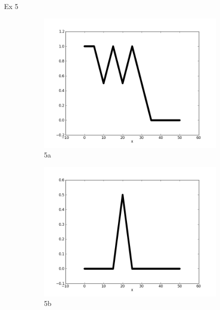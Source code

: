 \documentclass{report}
\begin{document}
\newpage
Ex 5
\begin{figure}[ht]
        \begin{subfigure}[b]{0.5\textwidth}
                \centering
                \includegraphics[width=\textwidth]{ex5a.png}
                \caption{5a}
        \end{subfigure}
	\begin{subfigure}[b]{0.5\textwidth}
                \centering
                \includegraphics[width=\textwidth]{ex5b.png}
                \caption{5b}
	\end{subfigure}
	\begin{subfigure}[b]{0.5\textwidth}
                \centering

\end{subfigure}
\end{figure}
\end{document}
